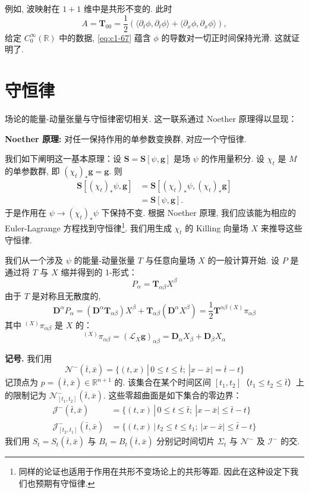 例如, 波映射在 $1+1$ 维中是共形不变的. 此时
\[
A = \mathbf{T}_{00} = \frac{1}{2}\left(\langle\partial_t\phi, \partial_t\phi\rangle + \langle\partial_x\phi, \partial_x\phi\rangle\right),
\]
给定 $C_0^\infty(\mathbb{R})$ 中的数据, \eqref{eq:c1-67} 蕴含 $\phi$ 的导数对一切正时间保持光滑. 这就证明了. 

\section{守恒律}

场论的能量-动量张量与守恒律密切相关. 这一联系通过 Noether 原理得以显现：

\textbf{Noether 原理:} 对任一保持作用的单参数变换群, 对应一个守恒律. 

我们如下阐明这一基本原理：设 $\mathbf{S} = \mathbf{S}[\psi, \mathbf{g}]$ 是场 $\psi$ 的作用量积分. 设 $\chi_t$ 是 $M$ 的单参数群, 即 $(\chi_t)_*\mathbf{g} = \mathbf{g}$. 则
\[
\begin{aligned}
\mathbf{S}[(\chi_t)_*\psi, \mathbf{g}] &= \mathbf{S}[(\chi_t)_*\psi, (\chi_t)_*\mathbf{g}]\\
&= \mathbf{S}[\psi, \mathbf{g}].
\end{aligned}
\]
于是作用在 $\psi \to (\chi_t)_*\psi$ 下保持不变. 根据 Noether 原理, 我们应该能为相应的 Euler-Lagrange 方程找到守恒律\footnote{同样的论证也适用于作用在共形不变场论上的共形等距. 因此在这种设定下我们也预期有守恒律. }. 我们用生成 $\chi_t$ 的 Killing 向量场 $X$ 来推导这些守恒律. 

我们从一个涉及 $\psi$ 的能量-动量张量 $T$ 与任意向量场 $X$ 的一般计算开始. 设 $P$ 是通过将 $T$ 与 $X$ 缩并得到的 1-形式：
\[
P_\alpha = \mathbf{T}_{\alpha\beta}X^\beta
\]
由于 $T$ 是对称且无散度的, 
\[
\mathbf{D}^\alpha P_\alpha = \left(\mathbf{D}^\alpha\mathbf{T}_{\alpha\beta}\right)X^\beta + \mathbf{T}_{\alpha\beta}\left(\mathbf{D}^\alpha X^\beta\right) = \frac{1}{2}\mathbf{T}^{\alpha\beta\, (X)}\pi_{\alpha\beta}
\]
其中 ${}^{(X)}\pi_{\alpha\beta}$ 是 $X$ 的：
\[
{}^{(X)}\pi_{\alpha\beta} = (\mathcal{L}_X\mathbf{g})_{\alpha\beta} = \mathbf{D}_\alpha X_\beta + \mathbf{D}_\beta X_\alpha
\]

\textbf{记号.} 我们用
\[
\mathcal{N}^-(\bar{t}, \bar{x}) = \{(t, x)\, |\, 0 \leq t \leq \bar{t};\ |x-\bar{x}| = \bar{t} - t\}
\]
记顶点为 $p = (\bar{t}, \bar{x}) \in \mathbb{R}^{n+1}$ 的. 该集合在某个时间区间 $[t_1, t_2]$（$t_1 \leq t_2 \leq \bar{t}$）上的限制记为 $\mathcal{N}^-_{[t_1, t_2]}(\bar{t}, \bar{x})$. 这些零超曲面是如下集合的零边界：
\[
\begin{aligned}
\mathcal{J}^-(\bar{t}, \bar{x}) &= \{(t, x)\, |\, 0 \leq t \leq \bar{t};\ |x-\bar{x}| \leq \bar{t} - t\}\\
\mathcal{J}^-_{[t_2, t_1]}(\bar{t}, \bar{x}) &= \{(t, x)\, |\, t_2 \leq t \leq t_1;\ |x-\bar{x}| \leq \bar{t} - t\}
\end{aligned}
\]
我们用 $S_t = S_t(\bar{t}, \bar{x})$ 与 $B_t = B_t(\bar{t}, \bar{x})$ 分别记时间切片 $\Sigma_t$ 与 $\mathcal{N}^-$ 及 $\mathcal{I}^-$ 的交. 

